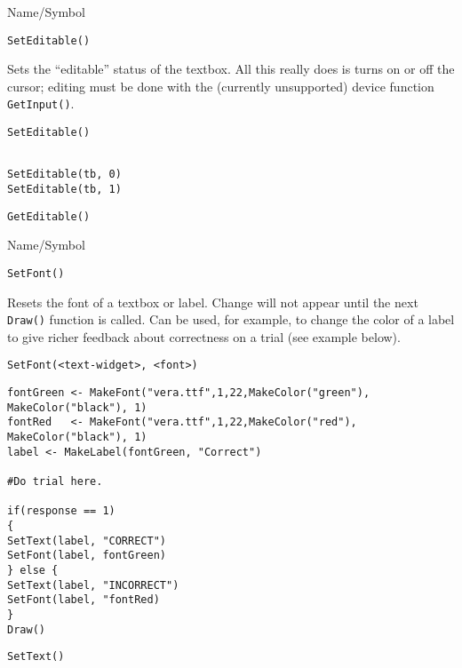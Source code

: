 \rl


\begin{desc}{Name/Symbol}
\item[Name/Symbol] 	\verb+SetEditable()+

\item[Description] Sets the ``editable'' status of the textbox.  All
  this really does is turns on or off the cursor; editing must be done
  with the (currently unsupported) device function \verb+GetInput()+.

\item[Usage] 
\begin{verbatim}
SetEditable()
\end{verbatim}

\item[Example]
\begin{verbatim}

SetEditable(tb, 0)
SetEditable(tb, 1)
\end{verbatim}

\item[See Also]    	\verb+GetEditable()+
\end{desc}

\rl


\begin{desc}{Name/Symbol}
\item[Name/Symbol] 	\verb+SetFont()+

\item[Description] Resets the font of a textbox or label.  Change will
  not appear until the next \verb+Draw()+ function is called.  Can be
  used, for example, to change the color of a label to give richer
  feedback about correctness on a trial (see example below).

\item[Usage]
\begin{verbatim}
SetFont(<text-widget>, <font>)
\end{verbatim}

\item[Example]   	
\begin{verbatim}
fontGreen <- MakeFont("vera.ttf",1,22,MakeColor("green"),
MakeColor("black"), 1)
fontRed   <- MakeFont("vera.ttf",1,22,MakeColor("red"),
MakeColor("black"), 1)
label <- MakeLabel(fontGreen, "Correct")

#Do trial here.       	

if(response == 1)
{
SetText(label, "CORRECT")
SetFont(label, fontGreen)
} else {
SetText(label, "INCORRECT")
SetFont(label, "fontRed)
}
Draw()
\end{verbatim}

\item[See Also]    	\verb+SetText()+
\end{desc}

